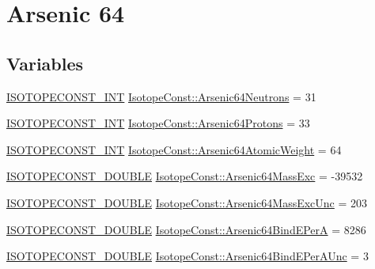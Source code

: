 \hypertarget{group___isotope_const-_arsenic-_as64}{}\section{Arsenic 64}
\label{group___isotope_const-_arsenic-_as64}
\subsection*{Variables}
\begin{DoxyCompactItemize}
\item 
\mbox{\hyperlink{group___isotope_const-_macros_ga5f18360b3e99483a35c32d789e62621c}{I\+S\+O\+T\+O\+P\+E\+C\+O\+N\+S\+T\+\_\+\+I\+NT}} \mbox{\hyperlink{group___isotope_const-_arsenic-_as64_gad523912c04133d54f722734dbf34860b}{Isotope\+Const\+::\+Arsenic64\+Neutrons}} = 31
\item 
\mbox{\hyperlink{group___isotope_const-_macros_ga5f18360b3e99483a35c32d789e62621c}{I\+S\+O\+T\+O\+P\+E\+C\+O\+N\+S\+T\+\_\+\+I\+NT}} \mbox{\hyperlink{group___isotope_const-_arsenic-_as64_ga02d67b752e8c5cf2dc12fd2af01ecbf4}{Isotope\+Const\+::\+Arsenic64\+Protons}} = 33
\item 
\mbox{\hyperlink{group___isotope_const-_macros_ga5f18360b3e99483a35c32d789e62621c}{I\+S\+O\+T\+O\+P\+E\+C\+O\+N\+S\+T\+\_\+\+I\+NT}} \mbox{\hyperlink{group___isotope_const-_arsenic-_as64_gaf10985440db7a7c598244a36f85c5c2f}{Isotope\+Const\+::\+Arsenic64\+Atomic\+Weight}} = 64
\item 
\mbox{\hyperlink{group___isotope_const-_macros_ga8f45a7272ce02c0b4c65c44636ed719a}{I\+S\+O\+T\+O\+P\+E\+C\+O\+N\+S\+T\+\_\+\+D\+O\+U\+B\+LE}} \mbox{\hyperlink{group___isotope_const-_arsenic-_as64_gac53f0dc24f6c47dadbd0d4ddaed8b5f1}{Isotope\+Const\+::\+Arsenic64\+Mass\+Exc}} = -\/39532
\item 
\mbox{\hyperlink{group___isotope_const-_macros_ga8f45a7272ce02c0b4c65c44636ed719a}{I\+S\+O\+T\+O\+P\+E\+C\+O\+N\+S\+T\+\_\+\+D\+O\+U\+B\+LE}} \mbox{\hyperlink{group___isotope_const-_arsenic-_as64_gaae1c728e4d1993dc6841d46e61ccb50a}{Isotope\+Const\+::\+Arsenic64\+Mass\+Exc\+Unc}} = 203
\item 
\mbox{\hyperlink{group___isotope_const-_macros_ga8f45a7272ce02c0b4c65c44636ed719a}{I\+S\+O\+T\+O\+P\+E\+C\+O\+N\+S\+T\+\_\+\+D\+O\+U\+B\+LE}} \mbox{\hyperlink{group___isotope_const-_arsenic-_as64_ga070fd9841841b7f2bf29ab5c1d37a28c}{Isotope\+Const\+::\+Arsenic64\+Bind\+E\+PerA}} = 8286
\item 
\mbox{\hyperlink{group___isotope_const-_macros_ga8f45a7272ce02c0b4c65c44636ed719a}{I\+S\+O\+T\+O\+P\+E\+C\+O\+N\+S\+T\+\_\+\+D\+O\+U\+B\+LE}} \mbox{\hyperlink{group___isotope_const-_arsenic-_as64_ga3adb19673ab1070a8a8153651946d820}{Isotope\+Const\+::\+Arsenic64\+Bind\+E\+Per\+A\+Unc}} = 3

\end{DoxyCompactItemize}
